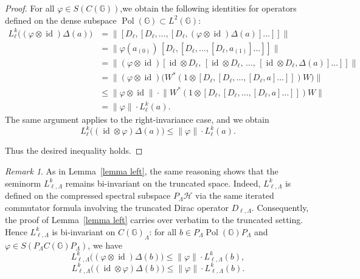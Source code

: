 \documentclass[12pt, reqno]{amsart}
\theoremstyle{definition}
\theoremstyle{remark}
\newtheorem{remark}[theorem]{Remark}
\numberwithin{equation}{section}
\begin{document}
\begin{proof}
 
For all \(\varphi \in S(C(\mathbb{G}))\),we  obtain the following identities for operators defined on the 
dense subspace \(\operatorname{Pol}(\mathbb{G}) \subset L^2(\mathbb{G})\):
\begin{align*}
L_\ell^k\bigl((\varphi \otimes \operatorname{id})\Delta(a)\bigr)
&= \bigl\| [D_\ell, [D_\ell, \dots, [D_\ell, 
   (\varphi \otimes \operatorname{id})\Delta(a)]\dots]] \bigr\| \\
&= \bigl\| \varphi(a_{(0)}) \, [D_\ell, [D_\ell, \dots, [D_\ell, a_{(1)}]\dots]] \bigr\| \\
&= \bigl\| (\varphi \otimes \operatorname{id}) 
   [\operatorname{id} \otimes D_\ell,\,
    [\operatorname{id} \otimes D_\ell,\,
     \dots,\,
    [\operatorname{id} \otimes D_\ell, \Delta(a)]\dots]] \bigr\| \\
&= \bigl\| (\varphi \otimes \operatorname{id}) 
   \bigl( W^* (1 \otimes [D_\ell, [D_\ell, \dots, [D_\ell, a]\dots]]) W \bigr) \bigr\| \\
&\le \|\varphi \otimes \operatorname{id}\| \cdot 
   \bigl\| W^* (1 \otimes [D_\ell, [D_\ell, \dots, [D_\ell, a]\dots]]) W \bigr\| \\
&= \|\varphi\| \cdot L_\ell^k(a).
\end{align*}
The same argument applies to the right-invariance case, and we obtain  \[L_\ell^k\bigl(( \operatorname{id}\otimes\varphi)\Delta(a)\bigr) 
\le \|\varphi\| \cdot L_\ell^k(a).\]

Thus the desired inequality holds.
\end{proof}

\begin{remark}
As in Lemma~\ref{lemma left}, the same reasoning shows that the seminorm 
\(L_{\ell,\Lambda}^k\) remains bi-invariant on the truncated space. Indeed, 
\(L_{\ell,\Lambda}^k\) is defined on the compressed spectral subspace 
\(P_\Lambda \mathcal{H}\) via the same iterated commutator formula involving the 
truncated Dirac operator \(D_{\ell,\Lambda}\). Consequently, the proof of 
Lemma~\ref{lemma left} carries over verbatim to the truncated setting. Hence 
\(L_{\ell,\Lambda}^k\) is bi-invariant on \(C(\mathbb{G})_\Lambda\): for all \(b \in P_\Lambda \operatorname{Pol}(\mathbb{G}) P_\Lambda\) 
and \(\varphi \in S(P_\Lambda C(\mathbb{G}) P_\Lambda)\), we have
\[
L_{\ell,\Lambda}^k\bigl((\varphi \otimes \operatorname{id})\Delta(b)\bigr) 
\le \|\varphi\| \cdot L_{\ell,\Lambda}^k(b),
\]
\[
L_{\ell,\Lambda}^k\bigl(( \operatorname{id}\otimes\varphi)\Delta(b)\bigr) 
\le \|\varphi\| \cdot L_{\ell,\Lambda}^k(b).
\]
\end{remark}
\end{document}
